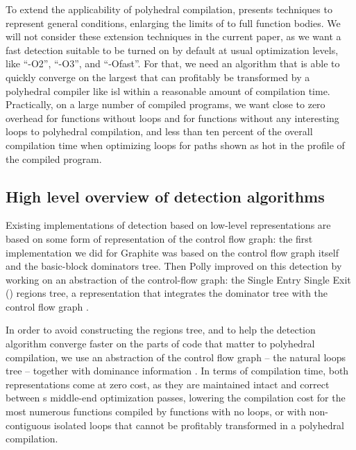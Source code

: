 \documentclass{sig-alternate}
\begin{document}
To extend the applicability of polyhedral compilation, \cite{scopExtend}
presents techniques to represent general conditions, enlarging the limits of
 to full function bodies.  We will not consider these \SCoP{} extension
techniques in the current paper, as we want a fast \SCoP{} detection suitable to be
turned on by default at usual optimization levels, like ``-O2'', ``-O3'', and
``-Ofast''.  For that, we need an algorithm that is able to quickly converge on
the largest  that can profitably be transformed by a polyhedral compiler
like isl \cite{verdoolaege2010isl} within a reasonable amount of compilation
time.  Practically, on a large number of compiled programs, we want close to
zero overhead for functions without loops and for functions without any
interesting loops to polyhedral compilation, and less than ten percent of the
overall compilation time when optimizing loops for paths shown as hot in the
profile of the compiled program.

\subsection{High level overview of \SCoP{} detection algorithms}

Existing implementations of \SCoP{} detection based on low-level representations
are based on some form of representation of the control flow graph: the first
implementation we did for Graphite \cite{graphite} was based on the control flow
graph itself and the basic-block dominators tree.  Then Polly improved on this
\SCoP{} detection \cite{polly, grosser2012polly} by working on an abstraction of
the control-flow graph: the Single Entry Single Exit (\SESE{}) regions tree, a
representation that integrates the dominator tree with the control flow graph
\cite{sese}.

In order to avoid constructing the regions tree, and to help the \SCoP{}
detection algorithm converge faster on the parts of code that matter to
polyhedral compilation, we use an abstraction of the control flow graph -- the
natural loops tree \cite{dragonbook} -- together with dominance information
\cite{ramalingam}.  In terms of compilation time, both representations come at
zero cost, as they are maintained intact and correct between s middle-end
optimization passes, lowering the compilation cost for the most numerous
functions compiled by \GCC{:} functions with no loops, or with non-contiguous
isolated loops that cannot be profitably transformed in a polyhedral
compilation.
\end{document}
